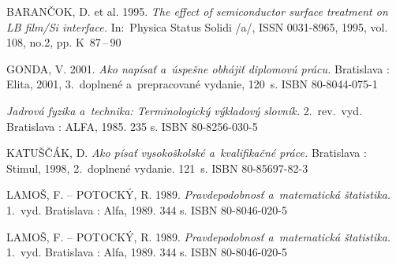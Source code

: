 \documentclass[a4paper]{feidippp}
\begin{document}
\begin{thebibliography}{999}
BARANČOK, D. et al. 1995. \emph{The effect of semiconductor surface treatment on LB film/Si interface.} In:~Physica Status Solidi /a/,  ISSN 0031-8965, 1995, vol. 108, no.2, pp. K~87\,--\,90

GONDA, V. 2001. \emph{Ako napísať a~úspešne obhájiť diplomovú prácu.} Bratislava : Elita, 2001, 3.~doplnené a~prepracované vydanie, 120~s. ISBN 80-8044-075-1

\emph{Jadrová fyzika a~technika: Terminologický výkladový slovník.} 2.~rev.~vyd. Bratislava : ALFA, 1985. 235 s. ISBN 80-8256-030-5

KATUŠČÁK, D. \emph{Ako písať vysokoškolské a~kvalifikačné práce.} Bratislava : Stimul, 1998, 2.~doplnené vydanie. 121~s. ISBN 80-85697-82-3


LAMOŠ, F. -- POTOCKÝ, R. 1989. \emph{Pravdepodobnosť a~matematická štatistika.} 1.~vyd. Bratislava : Alfa, 1989. 344 s. ISBN 80-8046-020-5


LAMOŠ, F. -- POTOCKÝ, R. 1989. \emph{Pravdepodobnosť a~matematická štatistika.} 1.~vyd. Bratislava : Alfa, 1989. 344 s. ISBN 80-8046-020-5


\end{thebibliography}
\end{document}

